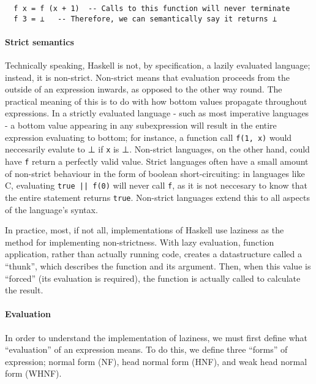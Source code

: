 \documentclass[9pt]{extarticle}
\begin{document}
\begin{verbatim}
  f x = f (x + 1)  -- Calls to this function will never terminate
  f 3 = ⊥   -- Therefore, we can semantically say it returns ⊥
\end{verbatim}

\paragraph{Strict semantics}

Technically speaking, Haskell is not, by specification, a lazily
evaluated language; instead, it is non-strict. Non-strict means that
evaluation proceeds from the outside of an expression inwards, as
opposed to the other way round. The practical meaning of this is to do
with how bottom values propagate throughout expressions. In a strictly
evaluated language - such as most imperative languages - a bottom value
appearing in any subexpression will result in the entire expression
evaluating to bottom; for instance, a function call \verb'f(1, x)' would
neccesarily evalute to ⊥ if \verb'x' is ⊥. Non-strict
languages, on the other hand, could have \verb'f' return a perfectly
valid value. Strict languages often have a small amount of non-strict
behaviour in the form of boolean short-circuiting: in languages like C,
evaluating \verb'true || f(0)' will never call \verb'f', as it is not
neccesary to know that the entire statement returns \verb'true'.
Non-strict languages extend this to all aspects of the language's
syntax.

In practice, most, if not all, implementations of Haskell use laziness
as the method for implementing non-strictness. With lazy evaluation,
function application, rather than actually running code, creates a
datastructure called a ``thunk'', which describes the function and its
argument. Then, when this value is ``forced'' (its evaluation is
required), the function is actually called to calculate the result.

\paragraph{Evaluation}

In order to understand the implementation of laziness, we must first define what
``evaluation'' of an expression means. To do this, we define three ``forms'' of
expression; normal form (NF), head normal form (HNF), and weak head normal form
(WHNF).
\end{document}
